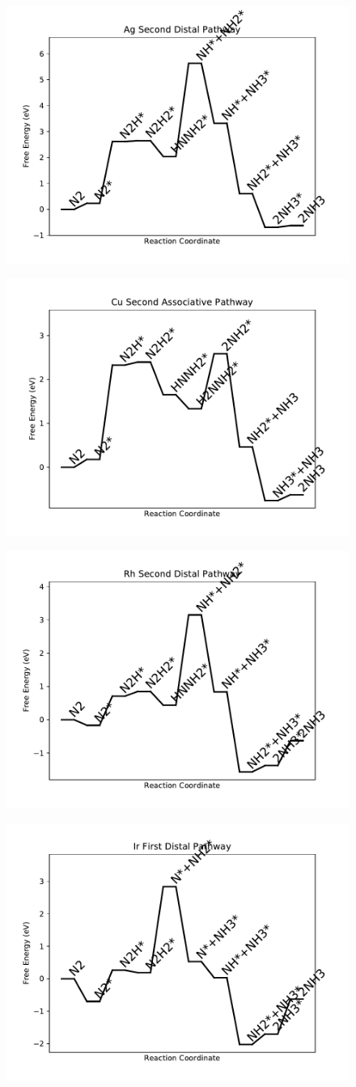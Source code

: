 \documentclass[journal=jacsat,manuscript=article]{achemso}
\begin{document}
\begin{figure}
\includegraphics[width=0.5\linewidth]{data/plots/Ag_distal_2.pdf}
\label{fig:Ag_distal_2}
\end{figure}

\begin{figure}
\includegraphics[width=0.5\linewidth]{data/plots/Cu_associative_2.pdf}
\label{fig:Cu_associative_2}
\end{figure}

\begin{figure}
\includegraphics[width=0.5\linewidth]{data/plots/Rh_distal_2.pdf}
\label{fig:Rh_distal_2}
\end{figure}

\begin{figure}
\includegraphics[width=0.5\linewidth]{data/plots/Ir_distal_1.pdf}
\label{fig:Ir_distal_1}
\end{figure}
\end{document}
